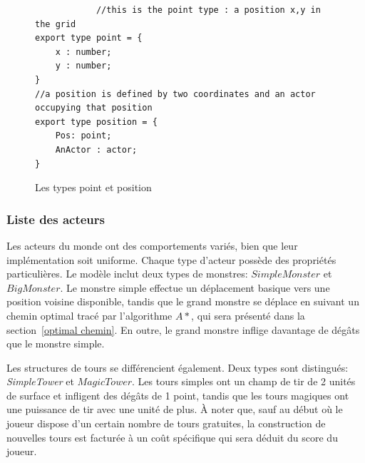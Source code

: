 \documentclass[11pt]{article}
\begin{document}
\begin{figure}[h]
            \centering
            \begin{verbatim}
            //this is the point type : a position x,y in the grid
export type point = {
    x : number;
    y : number;
}
//a position is defined by two coordinates and an actor occupying that position
export type position = {
    Pos: point;
    AnActor : actor;
}
            \end{verbatim}
            \caption{Les types point et position} 
            \label{fig: type_point_position } 
            \end{figure}
        
         \subsubsection{Liste des acteurs}\label{liste_acteurs}
            Les acteurs du monde ont des comportements variés, bien que leur implémentation soit uniforme. Chaque type d'acteur possède des propriétés particulières. Le modèle inclut deux types de monstres: $SimpleMonster$ et $BigMonster$. Le monstre simple effectue un déplacement basique vers une position voisine disponible, tandis que le grand monstre se déplace en suivant un chemin optimal tracé par l'algorithme $A*$, qui sera présenté dans la section~\ref{optimal chemin}. En outre, le grand monstre inflige davantage de dégâts que le monstre simple.
            
            Les structures de tours se différencient également. Deux types sont distingués: \textit{SimpleTower} et $MagicTower$. Les tours simples ont un champ de tir de 2 unités de surface et infligent des dégâts de 1 point, tandis que les tours magiques ont une puissance de tir avec une unité de plus. À noter que, sauf au début où le joueur dispose d'un certain nombre de tours gratuites, la construction de nouvelles tours est facturée à un coût spécifique qui sera déduit du score du joueur.
\end{document}
